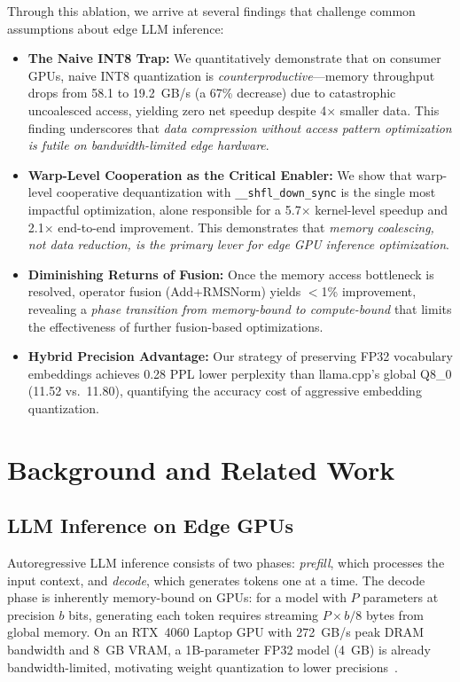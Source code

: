 \documentclass[conference]{IEEEtran}
\begin{document}
Through this ablation, we arrive at several findings that challenge common assumptions about edge LLM inference:

\begin{itemize}
    \item \textbf{The Naive INT8 Trap:} We quantitatively demonstrate that on consumer GPUs, naive INT8 quantization is \emph{counterproductive}---memory throughput drops from 58.1 to 19.2~GB/s (a 67\% decrease) due to catastrophic uncoalesced access, yielding zero net speedup despite 4$\times$ smaller data. This finding underscores that \emph{data compression without access pattern optimization is futile on bandwidth-limited edge hardware}.
    \item \textbf{Warp-Level Cooperation as the Critical Enabler:} We show that warp-level cooperative dequantization with \texttt{\_\_shfl\_down\_sync} is the single most impactful optimization, alone responsible for a 5.7$\times$ kernel-level speedup and 2.1$\times$ end-to-end improvement. This demonstrates that \emph{memory coalescing, not data reduction, is the primary lever for edge GPU inference optimization}.
    \item \textbf{Diminishing Returns of Fusion:} Once the memory access bottleneck is resolved, operator fusion (Add+RMSNorm) yields $<$1\% improvement, revealing a \emph{phase transition from memory-bound to compute-bound} that limits the effectiveness of further fusion-based optimizations.
    \item \textbf{Hybrid Precision Advantage:} Our strategy of preserving FP32 vocabulary embeddings achieves 0.28 PPL lower perplexity than llama.cpp's global Q8\_0 (11.52 vs.\ 11.80), quantifying the accuracy cost of aggressive embedding quantization.
\end{itemize}

\section{Background and Related Work}

\subsection{LLM Inference on Edge GPUs}
Autoregressive LLM inference consists of two phases: \emph{prefill}, which processes the input context, and \emph{decode}, which generates tokens one at a time. The decode phase is inherently memory-bound on GPUs: for a model with $P$ parameters at precision $b$ bits, generating each token requires streaming $P \times b / 8$ bytes from global memory. On an RTX~4060 Laptop GPU with 272~GB/s peak DRAM bandwidth and 8~GB VRAM, a 1B-parameter FP32 model (4~GB) is already bandwidth-limited, motivating weight quantization to lower precisions~\cite{dettmers2022gptint8}.
\end{document}
